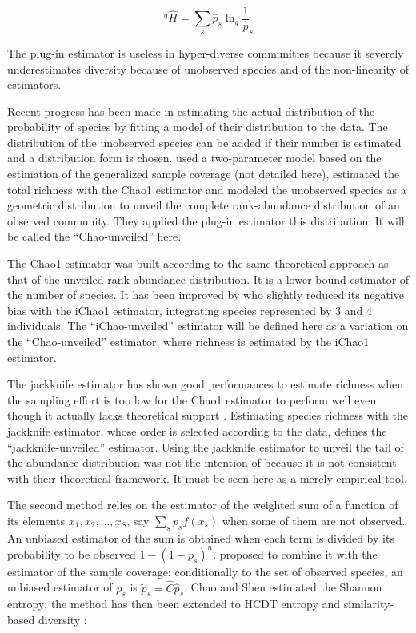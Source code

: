 \documentclass[fleqn,10pt]{latex/stylish_article} %
\begin{document}
\begin{equation}
  ^{q}{\hat{H}} = \sum_{s}{{\hat{p}}_s \ln_q{\frac{1}{\hat{p}}_s}}
  \label{eq:Hplugin}
\end{equation}

The plug-in estimator is useless in hyper-diverse communities because it severely underestimates diversity because of unobserved species and of the non-linearity of estimators.

Recent progress has been made in estimating the actual distribution of the probability of species by fitting a model of their distribution to the data.
The distribution of the unobserved species can be added if their number is estimated and a distribution form is chosen.
\citet{Chao2014c} used a two-parameter model based on the estimation of the generalized sample coverage (not detailed here), estimated the total richness with the Chao1 estimator and modeled the unobserved species as a geometric distribution to unveil the complete rank-abundance distribution of an observed community.
They applied the plug-in estimator this distribution: It will be called the ``Chao-unveiled'' here.

The Chao1 estimator was built according to the same theoretical approach as that of the unveiled rank-abundance distribution.
It is a lower-bound estimator of the number of species.
It has been improved by \citet{Chiu2014a} who slightly reduced its negative bias with the iChao1 estimator, integrating species represented by 3 and 4 individuals.
The ``iChao-unveiled'' estimator will be defined here as a variation on the ``Chao-unveiled'' estimator, where richness is estimated by the iChao1 estimator.

The jackknife estimator \citep{Burnham1979} has shown good performances to estimate richness when the sampling effort is too low for the Chao1 estimator to perform well \citep{Brose2003} even though it actually lacks theoretical support \citep{Cormack1989}.
Estimating species richness with the jackknife estimator, whose order is selected according to the data, defines the ``jackknife-unveiled'' estimator.
Using the jackknife estimator to unveil the tail of the abundance distribution was not the intention of \citet{Chao2014c} because it is not consistent with their theoretical framework.
It must be seen here as a merely empirical tool.

The second method relies on the \citet{Horvitz1952} estimator of the weighted sum of a function of its elements \({x_1, x_2, ..., x_S}\), say \(\sum_{s}{p_s f(x_s)}\) when some of them are not observed.
An unbiased estimator of the sum is obtained when each term is divided by its probability to be observed \(1-(1-p_s)^n\).
\citet{Chao2003} proposed to combine it with the estimator of the sample coverage: conditionally to the set of observed species, an unbiased estimator \citep{Ashbridge2000} of \(p_s\) is \(\tilde{p}_s = \hat{C} \hat{p}_s\).
Chao and Shen estimated the Shannon entropy; the method has then been extended to HCDT entropy \citep{Marcon2014a} and similarity-based diversity \citep{Marcon2014e}:
\end{document}

